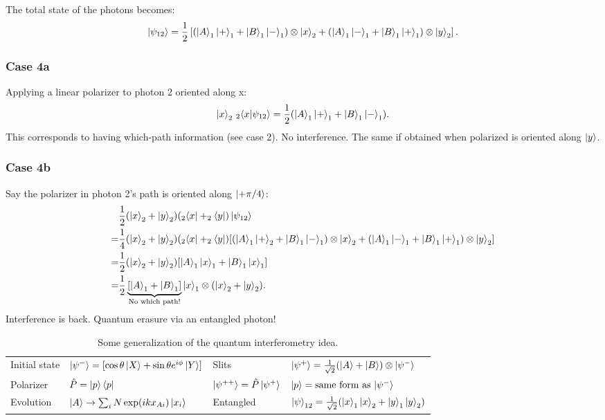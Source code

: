 The total state of the photons becomes:
\begin{align*}
    \left|\psi_{12}\right\rangle=\frac{1}{2}\left[(\left|A\right\rangle_1\left|+\right\rangle_1+\left|B\right\rangle_1\left|-\right\rangle_1)\otimes\left|x\right\rangle_2+(\left|A\right\rangle_1\left|-\right\rangle_1+\left|B\right\rangle_1\left|+\right\rangle_1)\otimes\left|y\right\rangle_2\right].
\end{align*}
\subsubsection{Case 4a}
Applying a linear polarizer to photon 2 oriented along x:
\begin{align*}
    \left|x\right\rangle_{2}\, {}_{2}\langle x|\psi_{12}\rangle=\frac{1}{2}(\left|A\right\rangle_1\left|+\right\rangle_1+\left|B\right\rangle_1\left|-\right\rangle_1).
\end{align*}
This corresponds to having which-path information (see case 2). No interference. The same if obtained when polarized is oriented along $\left|y\right\rangle$.

\subsubsection{Case 4b}
Say the polarizer in photon 2's path is oriented along $\left|+\pi/4\right\rangle$:
\begin{align*}
    &\frac{1}{2}(\left|x\right\rangle_2+\left|y\right\rangle_2)(_2\left\langle x\right|+_2\left\langle y\right|)\left|\psi_{12}\right\rangle\\
    =&\frac{1}{4}(\left|x\right\rangle_2+\left|y\right\rangle_2)(_2\left\langle x\right|+_2\left\langle y\right|)[(\left|A\right\rangle_1\left|+\right\rangle_2+
    \left|B\right\rangle_1\left|-\right\rangle_1)\otimes\left|x\right\rangle_2+(\left|A\right\rangle_1\left|-\right\rangle_1+\left|B\right\rangle_1\left|+\right\rangle_1)\otimes\left|y\right\rangle_2]\\
    =&\frac{1}{2}(\left|x\right\rangle_2+\left|y\right\rangle_2)[\left|A\right\rangle_1\left|x\right\rangle_1+\left|B\right\rangle_1\left|x\right\rangle_1]\\
    =&\frac{1}{2}\underbrace{[\left|A\right\rangle_1+\left|B\right\rangle_1]}_{\text{No which path!}}\left|x\right\rangle_1\otimes(\left|x\right\rangle_2+\left|y\right\rangle_2).
\end{align*}
Interference is back. Quantum erasure via an entangled photon!
\begin{table}[htbp]
    \centering
    \caption{Some generalization of the quantum interferometry idea.}
    \begin{tabular}{l|l|l|l}
        Initial state&$\left|\psi^-\right\rangle=[\cos\theta\left|X\right\rangle+\sin\theta e^{i\phi}\left|Y\right\rangle]$&Slits&$\left|\psi^+\right\rangle=\frac{1}{\sqrt{2}}(\left|A\right\rangle+\left|B\right\rangle)\otimes\left|\psi^-\right\rangle$\\
        Polarizer&$\hat{P}=\left|p\right\rangle\left\langle p\right|$&$\left|\psi^{++}\right\rangle=\hat{P}\left|\psi^+\right\rangle$&$\left|p\right\rangle=\text{same form as $\left|\psi^-\right\rangle$}$\\
        Evolution&$\left|A\right\rangle\to\sum_iN\exp(ikx_{Ai})\left|x_i\right\rangle$&Entangled&$\left|\psi\right\rangle_{12}=\frac{1}{\sqrt{2}}(\left|x\right\rangle_1\left|x\right\rangle_2+\left|y\right\rangle_1\left|y\right\rangle_2)$
    \end{tabular}
\end{table} 


